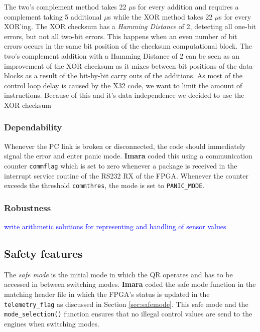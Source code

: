 \documentclass{article}
\newcommand\todo[1]{\textcolor{blue}{#1}} %
\begin{document}
The two's complement method takes 22 $\mu$s for every addition and requires a complement taking 5 additional $\mu$s while the \textsc{XOR} method takes 22 $\mu$s for every \textsc{XOR}'ing. The \textsc{XOR} checksum has a \emph{Hamming Distance} of 2, detecting all one-bit errors, but not all two-bit errors. This happens when an even number of bit errors occurs in the same bit position of the checksum computational block. The two's complement addition with a Hamming Distance of 2 can be seen as an improvement of the \textsc{XOR} checksum as it mixes between bit positions of the data-blocks as a result of the bit-by-bit carry outs of the additions. As most of the control loop delay is caused by the X32 code, we want to limit the amount of instructions. Because of this and it's data independence we decided to use the \textsc{XOR} checksum 

\subsubsection{Dependability}
Whenever the PC link is broken or disconnected, the code should immediately signal the error and enter panic mode. \textbf{Imara} coded this using a communication counter \texttt{commflag} which is set to zero whenever a package is received in the interrupt service routine of the RS232 RX of the FPGA. Whenever the counter exceeds the threshold \texttt{commthres}, the mode is set to \texttt{PANIC\_MODE}. 

\subsubsection{Robustness}
\todo{write arithmetic solutions for representing and handling of sensor values}


\subsection{Safety features}
The \emph{safe mode} is the initial mode in which the QR operates and has to be accessed in between switching modes. \textbf{Imara} coded the safe mode function in the matching header file in which the FPGA's status is updated in the \texttt{telemetry\_flag} as discussed in Section \ref{sec:safemode}. This safe mode and the \texttt{mode\_selection()} function ensures that no illegal control values are send to the engines when switching modes. 
\end{document}
